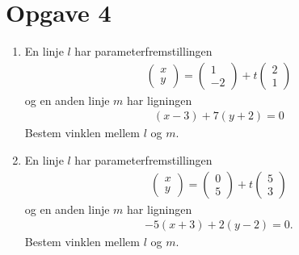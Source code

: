 \section*{Opgave 4}
\begin{enumerate}[label=\roman*)]
	\item En linje $l$ har parameterfremstillingen 
	\begin{align*}
		\begin{pmatrix}
			x \\ y
		\end{pmatrix} = 
		\begin{pmatrix}
			1 \\ -2
		\end{pmatrix} + t
		\begin{pmatrix}
			2 \\ 1
		\end{pmatrix}
	\end{align*}
	og en anden linje $m$ har ligningen
	\begin{align*}
		(x-3) + 7(y+2) = 0
	\end{align*}
	Bestem vinklen mellem $l$ og $m$. 
	\item En linje $l$ har parameterfremstillingen 
	\begin{align*}
		\begin{pmatrix}
			x \\ y
		\end{pmatrix} = 
		\begin{pmatrix}
			0 \\ 5
		\end{pmatrix} + t
		\begin{pmatrix}
			5 \\ 3
		\end{pmatrix}
	\end{align*}
	og en anden linje $m$ har ligningen
	\begin{align*}
		-5(x+3) + 2(y-2) = 0.
	\end{align*}
	Bestem vinklen mellem $l$ og $m$.
\end{enumerate}


